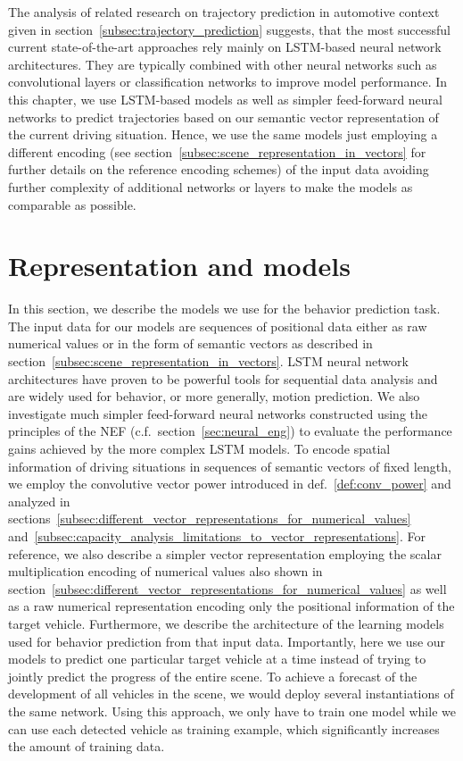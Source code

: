 The analysis of related research on trajectory prediction in automotive context given in section~\ref{subsec:trajectory_prediction} suggests, that the most successful current state-of-the-art approaches rely mainly on \ac{LSTM}-based neural network architectures.
They are typically combined with other neural networks such as convolutional layers or classification networks \parencite{Deo2018a} to improve model performance.
In this chapter, we use \ac{LSTM}-based models as well as simpler feed-forward neural networks to predict trajectories based on our semantic vector representation of the current driving situation.
Hence, we use the same models just employing a different encoding (see section~\ref{subsec:scene_representation_in_vectors} for further details on the reference encoding schemes) of the input data avoiding further complexity of additional networks or layers to make the models as comparable as possible.

\section{Representation and models}
\label{sec:repr_models}

In this section, we describe the models we use for the behavior prediction task.
The input data for our models are sequences of positional data either as raw numerical values or in the form of semantic vectors as described in section~\ref{subsec:scene_representation_in_vectors}.
\ac{LSTM} neural network architectures have proven to be powerful tools for sequential data analysis and are widely used for behavior, or more generally, motion prediction.
We also investigate much simpler feed-forward neural networks constructed using the principles of the \acl{NEF} (c.f.\ section~\ref{sec:neural_eng}) to evaluate the performance gains achieved by the more complex \ac{LSTM} models.
To encode spatial information of driving situations in sequences of semantic vectors of fixed length, we employ the convolutive vector power introduced in def.~\ref{def:conv_power} and analyzed in sections~\ref{subsec:different_vector_representations_for_numerical_values} and~\ref{subsec:capacity_analysis_limitations_to_vector_representations}.
For reference, we also describe a simpler vector representation employing the scalar multiplication encoding of numerical values also shown in section~\ref{subsec:different_vector_representations_for_numerical_values} as well as a raw numerical representation encoding only the positional information of the target vehicle.  
Furthermore, we describe the architecture of the learning models used for behavior prediction from that input data.
Importantly, here we use our models to predict one particular target vehicle at a time instead of trying to jointly predict the progress of the entire scene.
To achieve a forecast of the development of all vehicles in the scene, we would deploy several instantiations of the same network.
Using this approach, we only have to train one model while we can use each detected vehicle as training example, which significantly increases the amount of training data. 

